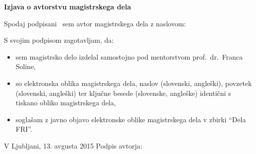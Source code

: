 \vspace*{1cm}
\begin{center}
{\Large \textbf{\sc Izjava o avtorstvu magistrskega dela}}
\end{center}

\vspace{1cm}
\noindent Spodaj podpisani \myname\ sem avtor magistrskega dela z naslovom:

\vspace{0.5cm}
\begin{center}
\emph{\mytitle}
\end{center}

\vspace{1cm}
\noindent S svojim podpisom zagotavljam, da:
\begin{itemize}
	\item sem magistrsko delo izdelal samostojno pod mentorstvom prof.~dr.\ Franca Soline,

	\item so elektronska oblika magistrskega dela, naslov (slovenski, angleški), povzetek (slovenski, angleški) ter ključne besede (slovenske, angleške) identični s tiskano obliko magistrskega dela,
	\item soglašam z javno objavo elektronske oblike magistrskega dela v zbirki ``Dela FRI''.
\end{itemize}

\vspace{1cm}
\noindent V Ljubljani, 13. avgusta 2015 \hfill Podpis avtorja: